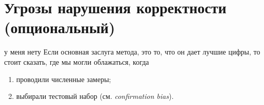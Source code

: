 
\section{Угрозы нарушения корректности (опциональный)}
у меня нету
Если основная заслуга метода, это то, что он дает лучшие цифры, то стоит сказать, где мы могли облажаться, когда
\begin{enumerate}
  \item проводили численные замеры;
  \item выбирали тестовый набор (см. \emph{confirmation bias}).
\end{enumerate}
